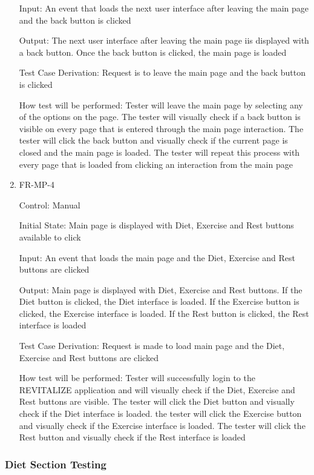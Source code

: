 \documentclass[12pt, titlepage]{article}
\begin{document}
\begin{enumerate}
Input: An event that loads the next user interface after leaving the main page and the back button is clicked
					
Output: The next user interface after leaving the main page iis displayed with a back button. Once the back button is clicked, the main page is loaded

Test Case Derivation: Request is to leave the main page and the back button is clicked

How test will be performed: Tester will leave the main page by selecting any of the options on the page. The tester will visually check if a back button is visible on every page that is entered through the main page interaction. The tester will click the back button and visually check if the current page is closed and the main page is loaded. The tester will repeat this process with every page that is  loaded from clicking an interaction from the main page
					
\item{FR-MP-4\\}

Control: Manual
					
Initial State: Main page is displayed with Diet, Exercise and Rest buttons available to click
					
Input: An event that loads the main page and the Diet, Exercise and Rest buttons are clicked

Output: Main page is displayed with Diet, Exercise and Rest buttons. If the Diet button is clicked, the Diet interface is loaded. If the Exercise button is clicked, the Exercise interface is loaded. If the Rest button is clicked, the Rest interface is loaded

Test Case Derivation: Request is made to load main page and the Diet, Exercise and Rest buttons are clicked

How test will be performed: Tester will successfully login to the REVITALIZE application and will visually check if the Diet, Exercise and Rest buttons are visible. The tester will click the Diet button and visually check if the Diet interface is loaded. the tester will click the Exercise button and visually check if the Exercise interface is loaded. The tester will click the Rest button and visually check if the Rest interface is loaded

\end{enumerate}

\subsubsection{Diet Section Testing}
\end{document}
